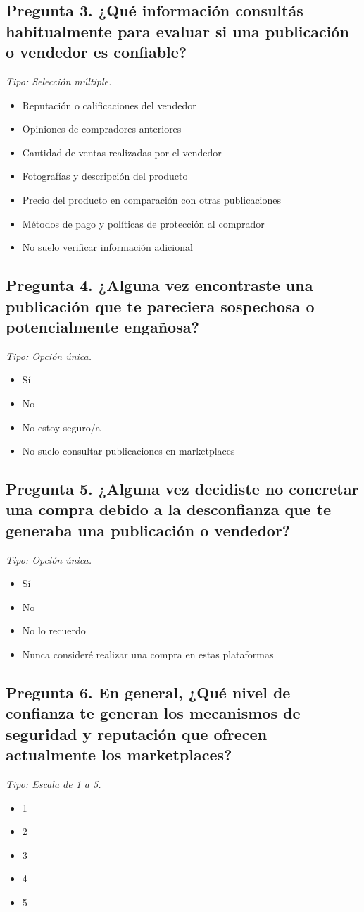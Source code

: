 \subsection*{Pregunta 3. ¿Qué información consultás habitualmente para evaluar si una publicación o vendedor es confiable?}
\noindent\textit{Tipo: Selección múltiple.}
\begin{itemize}\setlength\itemsep{1pt}
\item Reputación o calificaciones del vendedor
\item Opiniones de compradores anteriores
\item Cantidad de ventas realizadas por el vendedor
\item Fotografías y descripción del producto
\item Precio del producto en comparación con otras publicaciones
\item Métodos de pago y políticas de protección al comprador
\item No suelo verificar información adicional
\end{itemize}
\subsection*{Pregunta 4. ¿Alguna vez encontraste una publicación que te pareciera sospechosa o potencialmente engañosa?}
\noindent\textit{Tipo: Opción única.}
\begin{itemize}\setlength\itemsep{1pt}
\item Sí
\item No
\item No estoy seguro/a
\item No suelo consultar publicaciones en marketplaces
\end{itemize}
\subsection*{Pregunta 5. ¿Alguna vez decidiste no concretar una compra debido a la desconfianza que te generaba una publicación o vendedor?}
\noindent\textit{Tipo: Opción única.}
\begin{itemize}\setlength\itemsep{1pt}
\item Sí
\item No
\item No lo recuerdo
\item Nunca consideré realizar una compra en estas plataformas
\end{itemize}
\subsection*{Pregunta 6. En general, ¿Qué nivel de confianza te generan los mecanismos de seguridad y reputación que ofrecen actualmente los marketplaces?}
\noindent\textit{Tipo: Escala de 1 a 5.}
\begin{itemize}\setlength\itemsep{1pt}
\item 1
\item 2
\item 3
\item 4
\item 5
\end{itemize}
